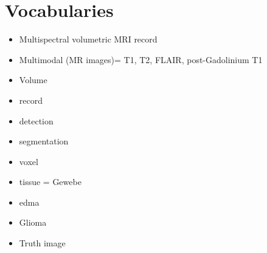 \documentclass{article}
\begin{document}
\section{Vocabularies}

\begin{itemize}
    \item Multispectral volumetric MRI record
    \item Multimodal (MR images)= T1, T2, FLAIR, post-Gadolinium T1
    \item Volume
    \item record
    \item detection 
    \item segmentation
    \item voxel
    \item tissue = Gewebe
    \item edma
    \item Glioma
    \item Truth image
\end{itemize}
\end{document}
